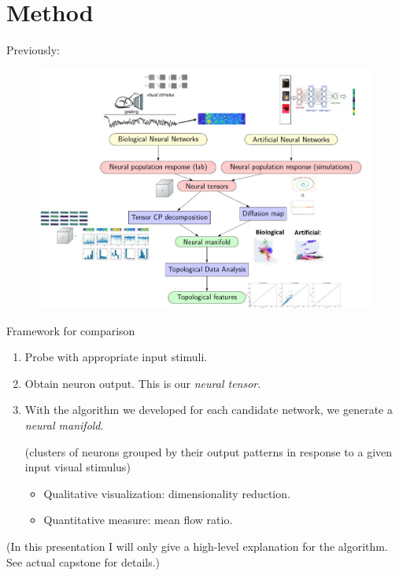 \documentclass[xcolor={dvipsnames,svgnames}]{beamer}
\begin{document}
\section{Method}
\begin{frame}{Previously:}
\begin{figure}[H]
        \centering
            \includegraphics[width=\textwidth]{Slide4.jpg}
        \end{figure} 
\end{frame}

\begin{frame}{Framework for comparison}
  \begin{enumerate} 
  \item Probe with appropriate input stimuli.
  \item Obtain neuron output. This is our \textit{neural tensor}.
  \item With the algorithm we developed for each candidate network, we generate a \textit{neural manifold}. 
  
  (clusters of neurons grouped by their output patterns in response to a given input visual stimulus)
    \begin{itemize}
        \item Qualitative visualization: dimensionality reduction.
        \item Quantitative measure: mean flow ratio.
    \end{itemize}
 \end{enumerate}
 (In this presentation I will only give a high-level explanation for the algorithm. See actual capstone for details.)
\end{frame}
\end{document}
